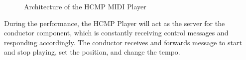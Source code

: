 \begin{figure}[H]
\caption{Architecture of the HCMP MIDI Player}
\end{figure}

During the performance, the HCMP Player will act as 
the server for the conductor component, which is constantly 
receiving control messages and responding accordingly. The
conductor receives and forwards message to start and stop playing,
set the position, and change the tempo.
